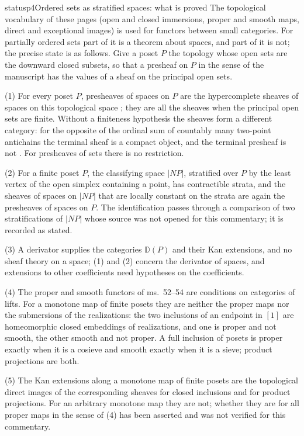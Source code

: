 \begin{dcomment}{status}{p4}{Ordered sets as stratified spaces: what is proved}
The topological vocabulary of these pages (open and closed immersions, proper and smooth maps, direct and exceptional images) is used for functors between small categories. For partially ordered sets part of it is a theorem about spaces, and part of it is not; the precise state is as follows. Give a poset $P$ the topology whose open sets are the downward closed subsets, so that a presheaf on $P$ in the sense of the manuscript has the values of a sheaf on the principal open sets.

(1) For every poset $P$, presheaves of spaces on $P$ are the hypercomplete sheaves of spaces on this topological space \citep[Proposition~3.12.11 and Example~3.12.15]{BGH2020}; they are all the sheaves when the principal open sets are finite. Without a finiteness hypothesis the sheaves form a different category: for the opposite of the ordinal sum of countably many two-point antichains the terminal sheaf is a compact object, and the terminal presheaf is not \citep[Example~A.13]{Aoki2023}. For presheaves of sets there is no restriction.

(2) For a finite poset $P$, the classifying space $|NP|$, stratified over $P$ by the least vertex of the open simplex containing a point, has contractible strata, and the sheaves of spaces on $|NP|$ that are locally constant on the strata are again the presheaves of spaces on $P$. The identification passes through a comparison of two stratifications of $|NP|$ whose source was not opened for this commentary; it is recorded as stated.

(3) A derivator supplies the categories $\mathbb D(P)$ and their Kan extensions, and no sheaf theory on a space; (1) and (2) concern the derivator of spaces, and extensions to other coefficients need hypotheses on the coefficients.

(4) The proper and smooth functors of ms.~52--54 are conditions on categories of lifts. For a monotone map of finite posets they are neither the proper maps nor the submersions of the realizations: the two inclusions of an endpoint in $[1]$ are homeomorphic closed embeddings of realizations, and one is proper and not smooth, the other smooth and not proper. A full inclusion of posets is proper exactly when it is a cosieve and smooth exactly when it is a sieve; product projections are both.

(5) The Kan extensions along a monotone map of finite posets are the topological direct images of the corresponding sheaves for closed inclusions and for product projections. For an arbitrary monotone map they are not; whether they are for all proper maps in the sense of (4) has been asserted and was not verified for this commentary.


\end{dcomment}
